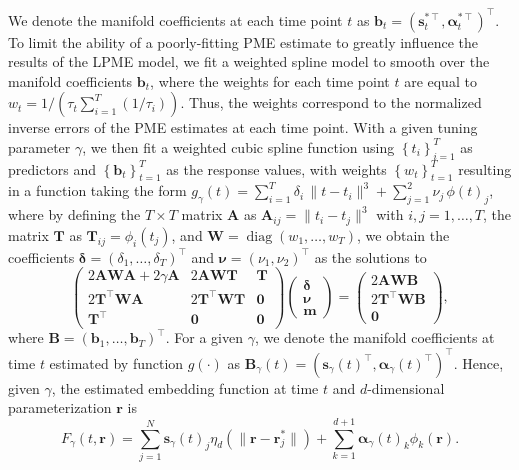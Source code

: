 \documentclass[12pt]{article}
\newcommand{\T}{\intercal}
\theoremstyle{definition}
\begin{document}
We denote the manifold coefficients at each time point $t$ as $\mathbf{b}_t = (\mathbf{s}_t^{*\T}, \mathbf{\alpha}_t^{*\T})^\T$. To limit the ability of a poorly-fitting PME estimate to greatly influence the results of the LPME model, we fit a weighted spline model to smooth over the manifold coefficients $\mathbf{b}_t$, where the weights for each time point $t$ are equal to $w_t = 1 / \left(\tau_t\sum_{i=1}^T(1/\tau_i)\right)$. Thus, the weights correspond to the normalized inverse errors of the PME estimates at each time point. With a given tuning parameter $\gamma$, we then fit a weighted cubic spline function using $\left\{t_i\right\}_{i=1}^T$ as predictors and $\left\{\mathbf{b}_t\right\}_{t=1}^T$ as the response values, with weights $\left\{w_t\right\}_{t=1}^T$ resulting in a function taking the form
$g_{\gamma}(t) = \sum_{i=1}^{T}\delta_i \,\|t - t_i\|^{3} + \sum_{j=1}^{2}\nu_j\,\phi(t)_j$,
where by defining the $T \times T$ matrix $\mathbf{A}$ as  $\mathbf{A}_{ij} = \|t_i - t_j\|^{3}$ with $i,j = 1,\ldots, T$, the matrix $\mathbf{T}$ as  $\mathbf{T}_{ij} = \phi_i(t_j)$, and $\mathbf{W} = \operatorname{diag}(w_1, \dots, w_T)$, we obtain the coefficients $\mathbf{\delta}=(\delta_1,\ldots,\delta_T)^\T$ and $\mathbf{\nu}=(\nu_1,\nu_2)^\T$ as the solutions to
\begin{equation}
  \left(
  \begin{array}{ccc}
    2\mathbf{A}\mathbf{W}\mathbf{A} + 2\gamma\mathbf{A} & 2\mathbf{A}\mathbf{W}\mathbf{T} & \mathbf{T} \\
    2\mathbf{T}^\T\mathbf{W}\mathbf{A} & 2\mathbf{T}^\T\mathbf{W}\mathbf{T} & \mathbf{0} \\
    \mathbf{T}^\T & \mathbf{0} & \mathbf{0}
  \end{array}
  \right)\left(
  \begin{array}{c}
    \mathbf{\delta} \\
    \mathbf{\nu} \\
    \mathbf{m}
  \end{array}
  \right) = \left(
  \begin{array}{c}
    2\mathbf{A}\mathbf{W}\mathbf{B} \\
    2\mathbf{T}^\T\mathbf{W}\mathbf{B} \\
    \mathbf{0}
  \end{array}
  \right), \label{eq:16}
\end{equation}
where $\mathbf{B}=(\mathbf{b}_1,\ldots, \mathbf{b}_T)^\T$. For a given $\gamma$, we denote the manifold coefficients at time $t$ estimated by function $g(\cdot)$ as $\mathbf{B}_{\gamma}(t) = \left(\mathbf{s}_{\gamma}(t)^\T, \mathbf{\alpha}_{\gamma}(t)^\T\right)^\T$. Hence, given $\gamma$, the estimated embedding function at time $t$ and $d$-dimensional parameterization $\mathbf{r}$ is
\begin{equation}
  F_{\gamma}(t, \mathbf{r}) = \sum_{j=1}^{N}\mathbf{s}_{\gamma}(t)_j \eta_{d}\left(\|\mathbf{r} - \mathbf{r}_j^*\|\right) + \sum_{k=1}^{d+1}\mathbf{\alpha}_{\gamma}(t)_k \phi_k(\mathbf{r}). \label{eq:17}
\end{equation}
\end{document}
